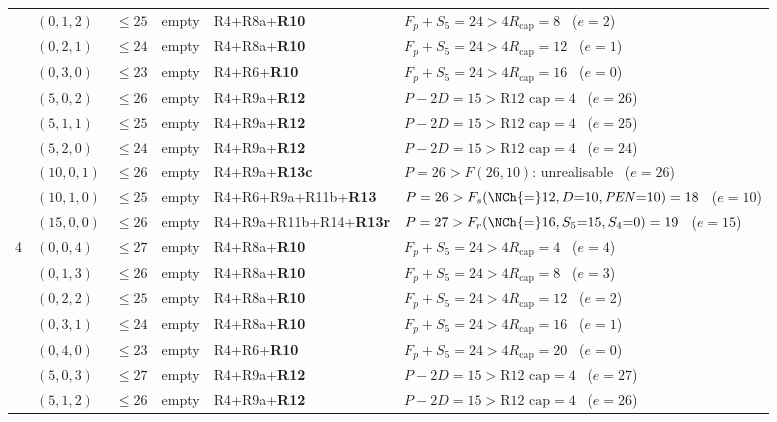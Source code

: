 \begin{table}[htbp]
\begin{tabular}{@{}clcl>{\raggedright\arraybackslash}p{29mm}>{\raggedright\arraybackslash}p{51mm}@{}}
 & $(0,1,2)$ & $\le25$ & empty & R4+\allowbreak R8a+\allowbreak \textbf{R10} & $F_p+S_5=24>4R_{\mathrm{cap}}=8$ \ ($e=2$)\\
 & $(0,2,1)$ & $\le24$ & empty & R4+\allowbreak R8a+\allowbreak \textbf{R10} & $F_p+S_5=24>4R_{\mathrm{cap}}=12$ \ ($e=1$)\\
 & $(0,3,0)$ & $\le23$ & empty & R4+\allowbreak R6+\allowbreak \textbf{R10} & $F_p+S_5=24>4R_{\mathrm{cap}}=16$ \ ($e=0$)\\
 & $(5,0,2)$ & $\le26$ & empty & R4+\allowbreak R9a+\allowbreak \textbf{R12} & $P-2D=15>\text{R12 cap}=4$ \ ($e=26$)\\
 & $(5,1,1)$ & $\le25$ & empty & R4+\allowbreak R9a+\allowbreak \textbf{R12} & $P-2D=15>\text{R12 cap}=4$ \ ($e=25$)\\
 & $(5,2,0)$ & $\le24$ & empty & R4+\allowbreak R9a+\allowbreak \textbf{R12} & $P-2D=15>\text{R12 cap}=4$ \ ($e=24$)\\
 & $(10,0,1)$ & $\le26$ & empty & R4+\allowbreak R9a+\allowbreak \textbf{R13c} & $P=26>F(26,10)$: unrealisable \ ($e=26$)\\
 & $(10,1,0)$ & $\le25$ & empty & R4+\allowbreak R6+\allowbreak R9a+\allowbreak R11b+\allowbreak \textbf{R13} & $P=26>F_s(\NCh{=}12,D{=}10,\mathit{PEN}{=}10)=18$ \ ($e=10$)\\
 & $(15,0,0)$ & $\le26$ & empty & R4+\allowbreak R9a+\allowbreak R11b+\allowbreak R14+\allowbreak \textbf{R13r} & $P=27>F_r(\NCh{=}16,S_5{=}15,S_4{=}0)=19$ \ ($e=15$)\\
\midrule
4 & $(0,0,4)$ & $\le27$ & empty & R4+\allowbreak R8a+\allowbreak \textbf{R10} & $F_p+S_5=24>4R_{\mathrm{cap}}=4$ \ ($e=4$)\\
 & $(0,1,3)$ & $\le26$ & empty & R4+\allowbreak R8a+\allowbreak \textbf{R10} & $F_p+S_5=24>4R_{\mathrm{cap}}=8$ \ ($e=3$)\\
 & $(0,2,2)$ & $\le25$ & empty & R4+\allowbreak R8a+\allowbreak \textbf{R10} & $F_p+S_5=24>4R_{\mathrm{cap}}=12$ \ ($e=2$)\\
 & $(0,3,1)$ & $\le24$ & empty & R4+\allowbreak R8a+\allowbreak \textbf{R10} & $F_p+S_5=24>4R_{\mathrm{cap}}=16$ \ ($e=1$)\\
 & $(0,4,0)$ & $\le23$ & empty & R4+\allowbreak R6+\allowbreak \textbf{R10} & $F_p+S_5=24>4R_{\mathrm{cap}}=20$ \ ($e=0$)\\
 & $(5,0,3)$ & $\le27$ & empty & R4+\allowbreak R9a+\allowbreak \textbf{R12} & $P-2D=15>\text{R12 cap}=4$ \ ($e=27$)\\
 & $(5,1,2)$ & $\le26$ & empty & R4+\allowbreak R9a+\allowbreak \textbf{R12} & $P-2D=15>\text{R12 cap}=4$ \ ($e=26$)\\

\end{tabular}
\end{table}
